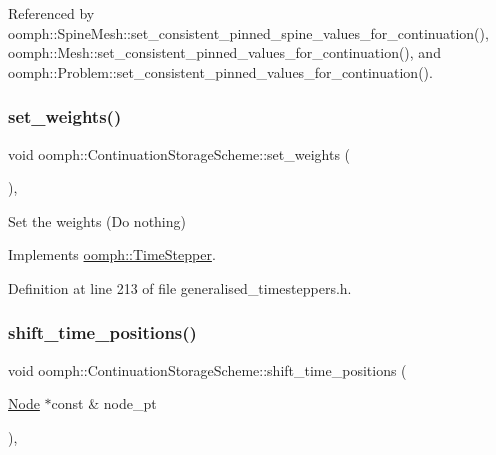 Referenced by oomph\+::\+Spine\+Mesh\+::set\+\_\+consistent\+\_\+pinned\+\_\+spine\+\_\+values\+\_\+for\+\_\+continuation(), oomph\+::\+Mesh\+::set\+\_\+consistent\+\_\+pinned\+\_\+values\+\_\+for\+\_\+continuation(), and oomph\+::\+Problem\+::set\+\_\+consistent\+\_\+pinned\+\_\+values\+\_\+for\+\_\+continuation().

\mbox{\label{classoomph_1_1ContinuationStorageScheme_a57108416ef10b5d0a7664ea2d748a4cb}} 
\subsubsection{\texorpdfstring{set\+\_\+weights()}{set\_weights()}}
{\footnotesize\ttfamily void oomph\+::\+Continuation\+Storage\+Scheme\+::set\+\_\+weights (\begin{DoxyParamCaption}{ }\end{DoxyParamCaption})\hspace{0.3cm}{\ttfamily [inline]}, {\ttfamily [virtual]}}



Set the weights (Do nothing) 



Implements \hyperlink{classoomph_1_1TimeStepper_a028fa3a8d3c6db6b0ddf580cb0468d55}{oomph\+::\+Time\+Stepper}.



Definition at line 213 of file generalised\+\_\+timesteppers.\+h.

\mbox{\label{classoomph_1_1ContinuationStorageScheme_a2271fd0ad65dda38686851df5a3970d5}} 
\subsubsection{\texorpdfstring{shift\+\_\+time\+\_\+positions()}{shift\_time\_positions()}}
{\footnotesize\ttfamily void oomph\+::\+Continuation\+Storage\+Scheme\+::shift\+\_\+time\+\_\+positions (\begin{DoxyParamCaption}\item[{\hyperlink{classoomph_1_1Node}{Node} $\ast$const \&}]{node\+\_\+pt }\end{DoxyParamCaption})\hspace{0.3cm}{\ttfamily [inline]}, {\ttfamily [virtual]}}



